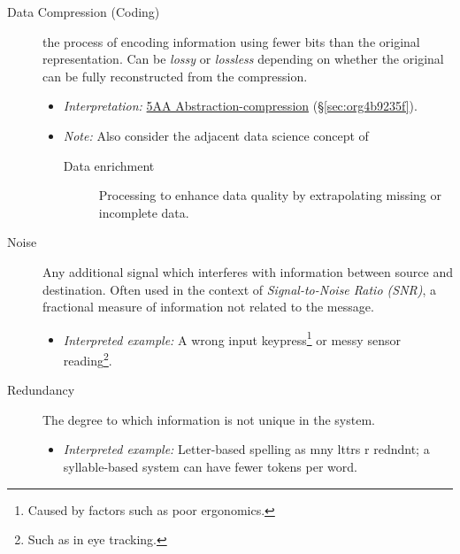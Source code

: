 \documentclass[logo,bsc,singlespacing,parskip]{infthesis}
\begin{document}
{\begin{mdframed}
\begin{description}
\item[{Data Compression (Coding)}] the process of encoding information using fewer bits than the original representation. Can be \emph{lossy} or \emph{lossless} depending on whether the original can be fully reconstructed from the compression.
\begin{itemize}
\item \emph{Interpretation:} \hyperref[sec:org4b9235f]{5AA Abstraction-compression} (\S \ref{sec:org4b9235f}).
\item \emph{Note:} Also consider the adjacent data science concept of
\begin{description}
\item[{Data enrichment}] Processing to enhance data quality by extrapolating missing or incomplete data.
\end{description}
\end{itemize}
\end{description}
\end{mdframed}

\begin{mdframed}
\begin{description}
\item[{Noise\label{noise}}] Any additional signal which interferes with information between source and destination.
Often used in the context of \emph{Signal-to-Noise Ratio (SNR)}, a fractional measure of information not related to the message.
\begin{itemize}
\item \emph{Interpreted example:} A wrong input keypress\footnote{Caused by factors such as poor ergonomics.} or messy sensor reading\footnote{Such as in eye tracking.}.
\end{itemize}
\end{description}
\end{mdframed}

\begin{mdframed}
\begin{description}
\item[{Redundancy}] The degree to which information is not unique in the system.
\begin{itemize}
\item \emph{Interpreted example:} Letter-based spelling as mny lttrs r redndnt; a syllable-based system can have fewer tokens per word.
\end{itemize}
\end{description}
\end{mdframed}

}
\end{document}
